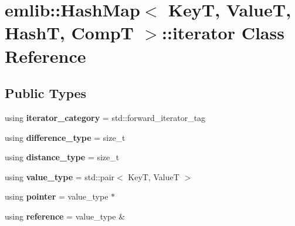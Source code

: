\hypertarget{classemlib_1_1_hash_map_1_1iterator}{\section{emlib\+:\+:Hash\+Map$<$ Key\+T, Value\+T, Hash\+T, Comp\+T $>$\+:\+:iterator Class Reference}
\label{classemlib_1_1_hash_map_1_1iterator}
}
\subsection*{Public Types}
\begin{DoxyCompactItemize}
\item 
\hypertarget{classemlib_1_1_hash_map_1_1iterator_afa7c05ed56ee72d7b5d94997df10b8a6}{using {\bfseries iterator\+\_\+category} = std\+::forward\+\_\+iterator\+\_\+tag}\label{classemlib_1_1_hash_map_1_1iterator_afa7c05ed56ee72d7b5d94997df10b8a6}

\item 
\hypertarget{classemlib_1_1_hash_map_1_1iterator_a91e5ebf00ae7d62f6764c24a01023a1d}{using {\bfseries difference\+\_\+type} = size\+\_\+t}\label{classemlib_1_1_hash_map_1_1iterator_a91e5ebf00ae7d62f6764c24a01023a1d}

\item 
\hypertarget{classemlib_1_1_hash_map_1_1iterator_a0210f1729113f998066815e6148b5b76}{using {\bfseries distance\+\_\+type} = size\+\_\+t}\label{classemlib_1_1_hash_map_1_1iterator_a0210f1729113f998066815e6148b5b76}

\item 
\hypertarget{classemlib_1_1_hash_map_1_1iterator_ac812c6ea0339570a6f6f6e300d42063b}{using {\bfseries value\+\_\+type} = std\+::pair$<$ Key\+T, Value\+T $>$}\label{classemlib_1_1_hash_map_1_1iterator_ac812c6ea0339570a6f6f6e300d42063b}

\item 
\hypertarget{classemlib_1_1_hash_map_1_1iterator_a1c9980515ea3f12e8b6bca06c3f14d0d}{using {\bfseries pointer} = value\+\_\+type $\ast$}\label{classemlib_1_1_hash_map_1_1iterator_a1c9980515ea3f12e8b6bca06c3f14d0d}

\item 
\hypertarget{classemlib_1_1_hash_map_1_1iterator_abf4d4a39e97a8923b29f8261fe1a4c81}{using {\bfseries reference} = value\+\_\+type \&}\label{classemlib_1_1_hash_map_1_1iterator_abf4d4a39e97a8923b29f8261fe1a4c81}

\end{DoxyCompactItemize}
